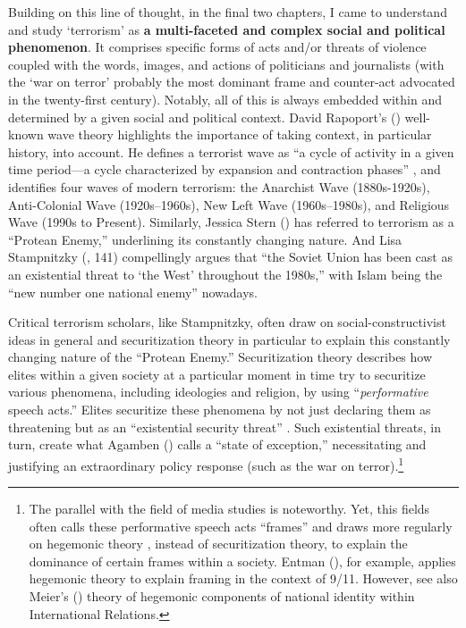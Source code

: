 Building on this line of thought, in the final two chapters, I came to understand and study `terrorism' as \textbf{a multi-faceted and complex social and political phenomenon}. It comprises specific forms of acts and/or threats of violence coupled with the words, images, and actions of politicians and journalists (with the `war on terror' probably the most dominant frame and counter-act advocated in the twenty-first century). Notably, all of this is always embedded within and determined by a given social and political context. David Rapoport's (\citeyear{Rapoport2004}) well-known wave theory highlights the importance of taking context, in particular history, into account. He defines a terrorist wave as ``a cycle of activity in a given time period---a cycle characterized by expansion and contraction phases'' \citep[][p. 47]{Rapoport2004}, and identifies four waves of modern terrorism: the Anarchist Wave (1880s-1920s), Anti-Colonial Wave (1920s--1960s), New Left Wave (1960s--1980s), and Religious Wave (1990s to Present). Similarly, Jessica Stern (\citeyear{Stern2003}) has referred to terrorism as a ``Protean Enemy,'' underlining its constantly changing nature. And Lisa Stampnitzky (\citeyear{Stampnitzky2013}, 141) compellingly argues that ``the Soviet Union has been cast as an existential threat to `the West' throughout the 1980s,'' with Islam being the ``new number one national enemy'' nowadays. 


Critical terrorism scholars, like Stampnitzky, often draw on social-constructivist ideas in general \citep{Wendt1992} and securitization theory in particular \citep{Buzan1998, Buzan1983} to explain this constantly changing nature of the ``Protean Enemy.'' Securitization theory describes how elites within a given society at a particular moment in time try to securitize various phenomena, including ideologies and religion, by using ``\textit{performative }speech acts.'' Elites securitize these phenomena by not just declaring them as threatening but as an ``existential security threat'' \citep[][p. 171--172; original emphasis]{Jorgensen2010}. Such existential threats, in turn, create what Agamben (\citeyear{Agamben2005}) calls a ``state of exception,'' necessitating and justifying an extraordinary policy response (such as the war on terror).\footnote{The parallel with the field of media studies is noteworthy. Yet, this fields often calls these performative speech acts ``frames'' and draws more regularly on hegemonic theory \citep{Gramsci2009}, instead of securitization theory, to explain the dominance of certain frames within a society. Entman (\citeyear{Entman2003}), for example, applies hegemonic theory to explain framing in the context of 9/11. However, see also Meier's (\citeyear{Meier2019}) theory of hegemonic components of national identity within International Relations. } 


